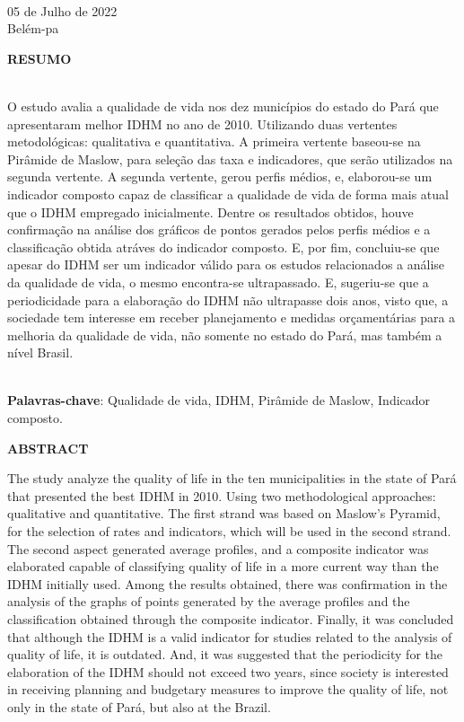\documentclass[a4paper, 10pt]{article}
\begin{document}
	\begin{center}
	\\
			
		\vspace{9cm}
			
			05 de Julho de 2022
			\\Belém-pa
	\end{center}
	\newpage
    \onehalfspacing 
       \begin{center}
         \Large
         \textbf{RESUMO}
       \end{center}
       \\
    O estudo avalia a qualidade de vida nos dez municípios do estado do Pará que apresentaram melhor IDHM no ano de 2010. Utilizando duas vertentes metodológicas: qualitativa e quantitativa. A primeira vertente baseou-se na Pirâmide de Maslow, para seleção das taxa e indicadores, que serão utilizados na segunda vertente. A segunda vertente, gerou perfis médios, e, elaborou-se um indicador composto capaz de classificar a qualidade de vida de forma mais atual que o IDHM empregado inicialmente. Dentre os resultados obtidos, houve confirmação na análise dos gráficos de pontos gerados pelos perfis médios e a classificação obtida atráves do indicador composto. E, por fim, concluiu-se que apesar do IDHM ser um indicador válido para os estudos relacionados a análise da qualidade de vida, o mesmo encontra-se ultrapassado. E, sugeriu-se que a periodicidade para a elaboração do IDHM não ultrapasse dois anos, visto que, a sociedade tem interesse em receber planejamento e medidas orçamentárias para a melhoria da qualidade de vida, não somente no estado do Pará, mas também a nível Brasil. 
    
    \\
    
    \noindent
    \textbf{Palavras-chave}: Qualidade de vida, IDHM, Pirâmide de Maslow, Indicador composto.
    
     \begin{center}
         \Large
         \textbf{ABSTRACT}
       \end{center}
   The study analyze the quality of life in the ten municipalities in the state of Pará that presented the best IDHM in 2010. Using two methodological approaches: qualitative and quantitative. The first strand was based on Maslow's Pyramid, for the selection of rates and indicators, which will be used in the second strand. The second aspect generated average profiles, and a composite indicator was elaborated capable of classifying quality of life in a more current way than the IDHM initially used. Among the results obtained, there was confirmation in the analysis of the graphs of points generated by the average profiles and the classification obtained through the composite indicator. Finally, it was concluded that although the IDHM is a valid indicator for studies related to the analysis of quality of life, it is outdated. And, it was suggested that the periodicity for the elaboration of the IDHM should not exceed two years, since society is interested in receiving planning and budgetary measures to improve the quality of life, not only in the state of Pará, but also at the Brazil.
    
\end{document}
